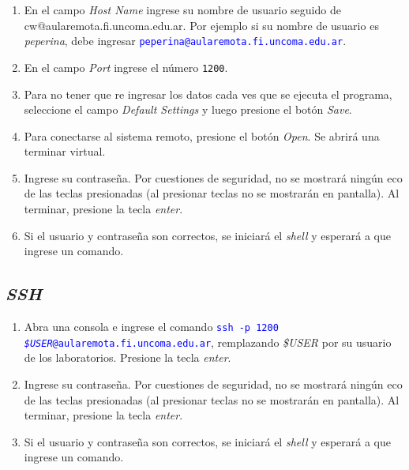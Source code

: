 \documentclass[12pt]{article}
\newcommand{\cw}[1]{\texttt{\textcolor{blue}{#1}}}
\begin{document}
\begin{enumerate}
\begin{figure}[!htb]
\end{figure}


    \item En el campo \emph{Host Name} ingrese su nombre de usuario seguido de
        \\cw{@aularemota.fi.uncoma.edu.ar}. Por ejemplo si su nombre de
        usuario es \emph{peperina}, debe ingresar
        \cw{peperina@aularemota.fi.uncoma.edu.ar}.

    \item En el campo \emph{Port} ingrese el número \texttt{1200}.

    \item Para no tener que re ingresar los datos cada ves que se ejecuta el
        programa, seleccione el campo \emph{Default Settings} y luego presione
        el botón \emph{Save}.

    \item Para conectarse al sistema remoto, presione el botón \emph{Open}. Se
        abrirá una terminar virtual.

    \item Ingrese su contraseña. Por cuestiones de seguridad, no se mostrará
        ningún eco de las teclas presionadas (al presionar teclas no se
        mostrarán en pantalla). Al terminar, presione la tecla 
        \emph{enter}.

    \item Si el usuario y contraseña son correctos, se iniciará el
        \emph{shell} y esperará a que ingrese un comando.

\end{enumerate}

\subsection*{\emph{SSH}}

\begin{enumerate}
    \item Abra una consola e ingrese el comando \cw{ssh -p 1200
        \emph{\$USER}@aularemota.fi.uncoma.edu.ar}, remplazando \emph{\$USER}
        por su usuario de los laboratorios. Presione la tecla \emph{enter}.

    \item Ingrese su contraseña. Por cuestiones de seguridad, no se mostrará
        ningún eco de las teclas presionadas (al presionar teclas no se
        mostrarán en pantalla). Al terminar, presione la tecla 
        \emph{enter}.

    \item Si el usuario y contraseña son correctos, se iniciará el
        \emph{shell} y esperará a que ingrese un comando.

\end{enumerate}
\end{document}

